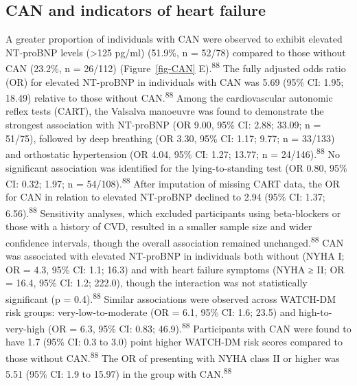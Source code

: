 \documentclass[
  letterpaper,
  headsepline=true,
  open=any]{scrbook}
\begin{document}
\restoregeometry

\hypertarget{can-and-indicators-of-heart-failure}{%
\subsection{CAN and indicators of heart
failure}\label{can-and-indicators-of-heart-failure}}

A greater proportion of individuals with CAN were observed to exhibit
elevated NT-proBNP levels (\textgreater125 pg/ml) (51.9\%, n = 52/78)
compared to those without CAN (23.2\%, n = 26/112) (Figure~\ref{fig-CAN}
E).\textsuperscript{88} The fully adjusted odds ratio (OR) for elevated
NT-proBNP in individuals with CAN was 5.69 (95\% CI: 1.95; 18.49)
relative to those without CAN.\textsuperscript{88} Among the
cardiovascular autonomic reflex tests (CART), the Valsalva manoeuvre was
found to demonstrate the strongest association with NT-proBNP (OR 9.00,
95\% CI: 2.88; 33.09; n = 51/75), followed by deep breathing (OR 3.30,
95\% CI: 1.17; 9.77; n = 33/133) and orthostatic hypertension (OR 4.04,
95\% CI: 1.27; 13.77; n = 24/146).\textsuperscript{88} No significant
association was identified for the lying-to-standing test (OR 0.80, 95\%
CI: 0.32; 1.97; n = 54/108).\textsuperscript{88} After imputation of
missing CART data, the OR for CAN in relation to elevated NT-proBNP
declined to 2.94 (95\% CI: 1.37; 6.56).\textsuperscript{88} Sensitivity
analyses, which excluded participants using beta-blockers or those with
a history of CVD, resulted in a smaller sample size and wider confidence
intervals, though the overall association remained
unchanged.\textsuperscript{88} CAN was associated with elevated
NT-proBNP in individuals both without (NYHA I; OR = 4.3, 95\% CI: 1.1;
16.3) and with heart failure symptoms (NYHA ≥ II; OR = 16.4, 95\% CI:
1.2; 222.0), though the interaction was not statistically significant (p
= 0.4).\textsuperscript{88} Similar associations were observed across
WATCH-DM risk groups: very-low-to-moderate (OR = 6.1, 95\% CI: 1.6;
23.5) and high-to-very-high (OR = 6.3, 95\% CI: 0.83;
46.9).\textsuperscript{88} Participants with CAN were found to have 1.7
(95\% CI: 0.3 to 3.0) point higher WATCH-DM risk scores compared to
those without CAN.\textsuperscript{88} The OR of presenting with NYHA
class II or higher was 5.51 (95\% CI: 1.9 to 15.97) in the group with
CAN.\textsuperscript{88}

\end{document}
